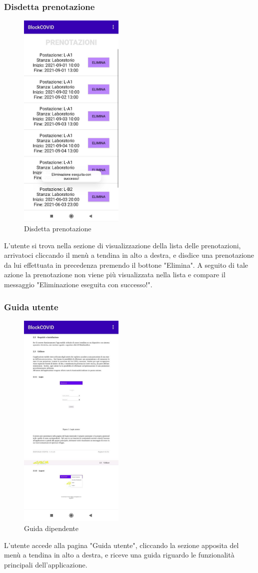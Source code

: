 	\subsubsection{Disdetta prenotazione}
	\begin{figure}[H]
		\centering
		\includegraphics[width=5cm]{res/images/MessaggioEliminazioneAvvenutaSuccesso.png}
		\caption{Disdetta prenotazione}
	\end{figure}
	L’utente si trova nella sezione di visualizzazione della lista delle prenotazioni, arrivatoci cliccando il menù a tendina in alto a destra, e disdice una prenotazione da lui effettuata in precedenza premendo il bottone "Elimina". A seguito di tale azione la prenotazione non viene più visualizzata nella lista e compare il messaggio "Eliminazione eseguita con successo!".
	\subsubsection{Guida utente}
	\begin{figure}[H]
		\centering
		\includegraphics[width=5cm]{res/images/guidaDipendente.png}
		\caption{Guida dipendente}
	\end{figure}
	L’utente accede alla pagina "Guida utente", cliccando la sezione apposita del menù a tendina in alto a destra, e riceve una guida riguardo le funzionalità principali dell'applicazione.
